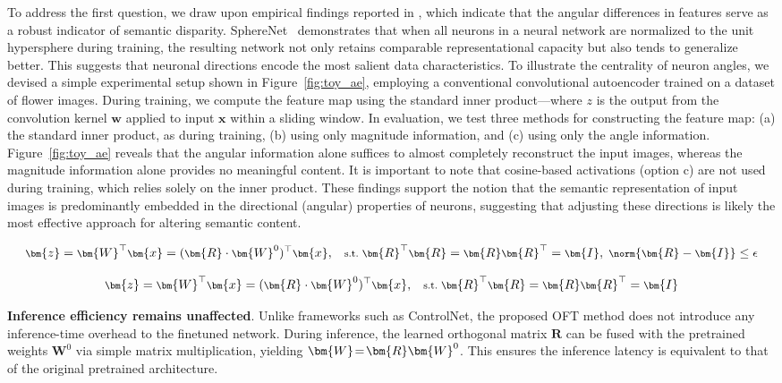 To address the first question, we draw upon empirical findings reported in \cite{liu2018decoupled,chen2020angular}, which indicate that the angular differences in features serve as a robust indicator of semantic disparity. SphereNet~\cite{liu2017deep} demonstrates that when all neurons in a neural network are normalized to the unit hypersphere during training, the resulting network not only retains comparable representational capacity but also tends to generalize better. This suggests that neuronal directions encode the most salient data characteristics. To illustrate the centrality of neuron angles, we devised a simple experimental setup shown in Figure~\ref{fig:toy_ae}, employing a conventional convolutional autoencoder trained on a dataset of flower images. During training, we compute the feature map using the standard inner product—where $z$ is the output from the convolution kernel $\bm{w}$ applied to input $\bm{x}$ within a sliding window. In evaluation, we test three methods for constructing the feature map: (a) the standard inner product, as during training, (b) using only magnitude information, and (c) using only the angle information. Figure~\ref{fig:toy_ae} reveals that the angular information alone suffices to almost completely reconstruct the input images, whereas the magnitude information alone provides no meaningful content. It is important to note that cosine-based activations (option c) are not used during training, which relies solely on the inner product. These findings support the notion that the semantic representation of input images is predominantly embedded in the directional (angular) properties of neurons, suggesting that adjusting these directions is likely the most effective approach for altering semantic content.

\begin{equation}\label{eq:coft_general}
    \footnotesize
    \bm{z} = \bm{W}^\top \bm{x} = (\bm{R} \cdot \bm{W}^0)^\top \bm{x}, ~~~ \text{s.t.}~ \bm{R}^\top \bm{R} = \bm{R} \bm{R}^\top = \bm{I}, ~ \norm{\bm{R} - \bm{I}} \leq \epsilon
\end{equation}

\begin{equation}\label{eq:oft_general}
    \footnotesize
    \bm{z}=\bm{W}^\top\bm{x}=(\bm{R}\cdot\bm{W}^0)^\top\bm{x},~~~\text{s.t.}~\bm{R}^\top\bm{R}=\bm{R}\bm{R}^\top=\bm{I}
\end{equation}

\textbf{Inference efficiency remains unaffected}. Unlike frameworks such as ControlNet, the proposed OFT method does not introduce any inference-time overhead to the finetuned network. During inference, the learned orthogonal matrix $\bm{R}$ can be fused with the pretrained weights $\bm{W}^0$ via simple matrix multiplication, yielding $\thickmuskip=2mu \medmuskip=2mu \bm{W}=\bm{R}\bm{W}^0$. This ensures the inference latency is equivalent to that of the original pretrained architecture.

